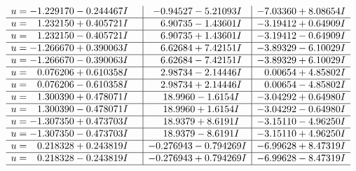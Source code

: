 \documentclass[1p]{elsarticle_modified}
\theoremstyle{definition}
\begin{document}
$$\begin{array}{c|c|c}
\begin{aligned}
u &= -1.229170 - 0.244467 I\end{aligned}
 & -0.94527 - 5.21093 I & -7.03360 + 8.08654 I \\ \hline\begin{aligned}
u &= \phantom{-}1.232150 + 0.405721 I\end{aligned}
 & \phantom{-}6.90735 - 1.43601 I & -3.19412 + 0.64909 I \\ \hline\begin{aligned}
u &= \phantom{-}1.232150 - 0.405721 I\end{aligned}
 & \phantom{-}6.90735 + 1.43601 I & -3.19412 - 0.64909 I \\ \hline\begin{aligned}
u &= -1.266670 + 0.390063 I\end{aligned}
 & \phantom{-}6.62684 + 7.42151 I & -3.89329 - 6.10029 I \\ \hline\begin{aligned}
u &= -1.266670 - 0.390063 I\end{aligned}
 & \phantom{-}6.62684 - 7.42151 I & -3.89329 + 6.10029 I \\ \hline\begin{aligned}
u &= \phantom{-}0.076206 + 0.610358 I\end{aligned}
 & \phantom{-}2.98734 - 2.14446 I & \phantom{-}0.00654 + 4.85802 I \\ \hline\begin{aligned}
u &= \phantom{-}0.076206 - 0.610358 I\end{aligned}
 & \phantom{-}2.98734 + 2.14446 I & \phantom{-}0.00654 - 4.85802 I \\ \hline\begin{aligned}
u &= \phantom{-}1.300390 + 0.478071 I\end{aligned}
 & \phantom{-}18.9960 - 1.6154 I & -3.04292 + 0.64980 I \\ \hline\begin{aligned}
u &= \phantom{-}1.300390 - 0.478071 I\end{aligned}
 & \phantom{-}18.9960 + 1.6154 I & -3.04292 - 0.64980 I \\ \hline\begin{aligned}
u &= -1.307350 + 0.473703 I\end{aligned}
 & \phantom{-}18.9379 + 8.6191 I & -3.15110 - 4.96250 I \\ \hline\begin{aligned}
u &= -1.307350 - 0.473703 I\end{aligned}
 & \phantom{-}18.9379 - 8.6191 I & -3.15110 + 4.96250 I \\ \hline\begin{aligned}
u &= \phantom{-}0.218328 + 0.243819 I\end{aligned}
 & -0.276943 - 0.794269 I & -6.99628 + 8.47319 I \\ \hline\begin{aligned}
u &= \phantom{-}0.218328 - 0.243819 I\end{aligned}
 & -0.276943 + 0.794269 I & -6.99628 - 8.47319 I\\
 \hline 
 \end{array}$$\newpage
\end{document}
